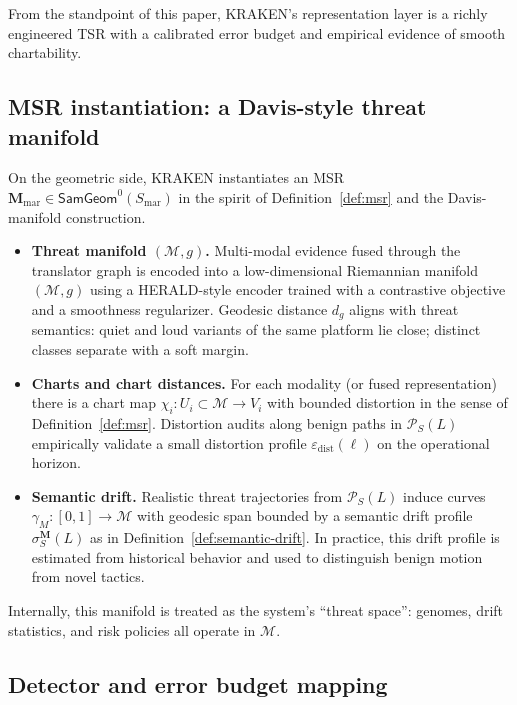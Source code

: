 \documentclass[11pt]{article}
\newcommand{\SamGeom}{\mathsf{SamGeom}}
\begin{document}
From the standpoint of this paper, KRAKEN’s representation layer is a richly
engineered TSR with a calibrated error budget and empirical evidence of smooth
chartability.

\subsection{MSR instantiation: a Davis-style threat manifold}

On the geometric side, KRAKEN instantiates an MSR
$\mathbf{M}_{\mathrm{mar}} \in \SamGeom^0(S_{\mathrm{mar}})$ in the spirit of
Definition~\ref{def:msr} and the Davis-manifold construction.

\begin{itemize}
  \item \textbf{Threat manifold $(\mathcal{M}, g)$.} Multi-modal evidence fused
  through the translator graph is encoded into a low-dimensional Riemannian
  manifold $(\mathcal{M}, g)$ using a HERALD-style encoder trained with a
  contrastive objective and a smoothness regularizer. Geodesic distance $d_g$
  aligns with threat semantics: quiet and loud variants of the same platform
  lie close; distinct classes separate with a soft margin.

  \item \textbf{Charts and chart distances.} For each modality (or fused
  representation) there is a chart map
  $\chi_i : U_i \subset \mathcal{M} \to V_i$ with bounded distortion in the
  sense of Definition~\ref{def:msr}. Distortion audits along benign paths
  in $\mathcal{P}_S(L)$ empirically validate a small distortion profile
  $\varepsilon_{\mathrm{dist}}(\ell)$ on the operational horizon.

  \item \textbf{Semantic drift.} Realistic threat trajectories from
  $\mathcal{P}_S(L)$ induce curves $\gamma_M : [0,1]\to\mathcal{M}$ with
  geodesic span bounded by a semantic drift profile $\sigma_S^{\mathbf{M}}(L)$
  as in Definition~\ref{def:semantic-drift}. In practice, this drift profile
  is estimated from historical behavior and used to distinguish benign motion
  from novel tactics.
\end{itemize}

Internally, this manifold is treated as the system's ``threat space'': genomes,
drift statistics, and risk policies all operate in $\mathcal{M}$.

\subsection{Detector and error budget mapping}
\end{document}
